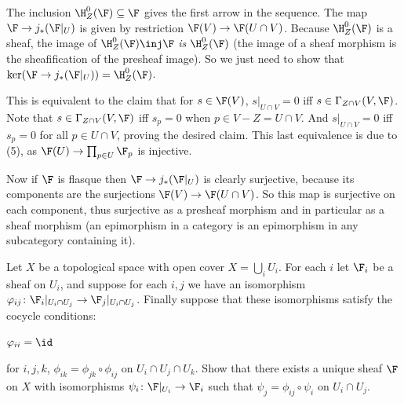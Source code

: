     \item The inclusion $\H^0_Z(\F)\subseteq\F$ gives the first arrow in the sequence.
    The map $\F\to j_*(\F|_U)$ is given by restriction $\F(V)\to \F(U\cap V)$.
    Because $\H^0_Z(\F)$ is a sheaf, the image of $\H^0_Z(\F)\inj\F$ {\it is\/} $\H^0_Z(\F)$ (the image of a sheaf morphism is the sheafification of the presheaf image).
    So we just need to show that $\ker(\F\to j_*(\F|_U))=\H^0_Z(\F)$.

    This is equivalent to the claim that for $s\in\F(V)$, $s|_{U\cap V}=0$ iff $s\in\Gamma_{Z\cap V}(V,\F)$.
    Note that $s\in\Gamma_{Z\cap V}(V,\F)$ iff $s_p=0$ when $p\in V-Z=U\cap V$.
    And $s|_{U\cap V}=0$ iff $s_p=0$ for all $p\in U\cap V$, proving the desired claim.
    This last equivalence is due to  (5), as $\F(U)\to\prod_{p\in U}\F_p$ is injective.

    Now if $\F$ is flasque then $\F\to j_*(\F|_U)$ is clearly surjective, because its components are the surjections $\F(V)\to\F(U\cap V)$.
    So this map is surjective on each component, thus surjective as a presheaf morphism and in particular as a sheaf morphism (an epimorphism in a category is an epimorphism in any subcategory
    containing it).
\eenum

\bprob[title={Hartshorne II.1.22}]

    Let $X$ be a topological space with open cover $X=\bigcup_iU_i$.
    For each $i$ let $\F_i$ be a sheaf on $U_i$, and suppose for each $i,j$ we have an isomorphism $\phi_{ij}\colon\F_i|_{U_i\cap U_j}\to\F_j|_{U_i\cap U_j}$.
    Finally suppose that these isomorphisms satisfy the {\emphcolor cocycle conditions}:
    \benum
        \item $\phi_{ii}=\id$
        \item for $i,j,k$, $\phi_{ik}=\phi_{jk}\circ\phi_{ij}$ on $U_i\cap U_j\cap U_k$.
    \eenum
    Show that there exists a unique sheaf $\F$ on $X$ with isomorphisms $\psi_i\colon\F|_{U_i}\to\F_i$ such that $\psi_j=\phi_{ij}\circ\psi_i$ on $U_i\cap U_j$.

\eprob

